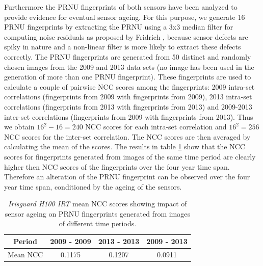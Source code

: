 \documentclass[10pt,twocolumn,letterpaper]{article}
\begin{document}
%

Furthermore the PRNU fingerprints of both sensors have been analyzed to provide evidence for eventual sensor ageing. For this purpose, we generate 16 PRNU fingerprints  by extracting the PRNU using a 3x3 median filter for computing noise residuals as proposed by Fridrich \cite{fridrich}, because sensor defects are spiky in nature and a non-linear filter is more likely to extract these defects correctly. The PRNU fingerprints are generated from 50 distinct and randomly chosen images from the 2009 and 2013 data sets (no image has been used in the generation of more than one PRNU fingerprint). 
These fingerprints are used to calculate a couple of pairwise NCC scores among the fingerprints: 2009 intra-set correlations (fingerprints from 2009 with fingerprints from 2009), 2013 intra-set correlations (fingerprints from 2013 with fingerprints from 2013) and 2009-2013 inter-set correlations (fingerprints from 2009 with fingerprints from 2013). Thus we obtain $16^{2}-16 = 240$ NCC scores for each intra-set correlation and $16^2 = 256$ NCC scores for the inter-set correlation. The NCC scores are then averaged by calculating the mean of the scores.
The results in table \ref{table:prnu_fp_corr} show that the NCC scores for fingerprints generated from images of the same time period are clearly higher then NCC scores of the fingerprints over the four year time span. Therefore an alteration of the PRNU fingerprint can be observed over the four year time span, conditioned by the ageing of the sensors.
 
 \begin{table} [hbt]
 \begin{center}
	\begin{tabular}{ c | c | c | c }
		   Period & 2009 - 2009 & 2013 - 2013 & 2009 - 2013 \\
		  \hline
			Mean NCC & 0.1175 & 0.1207  & 0.0911 
	\end{tabular}
	\vspace{2mm}
        \caption{\emph{Irisguard H100 IRT} mean NCC scores showing impact of sensor ageing on PRNU fingerprints generated from images of different time periods.}
    \label{table:prnu_fp_corr}
\end{center} 
\end{table}
\end{document}
